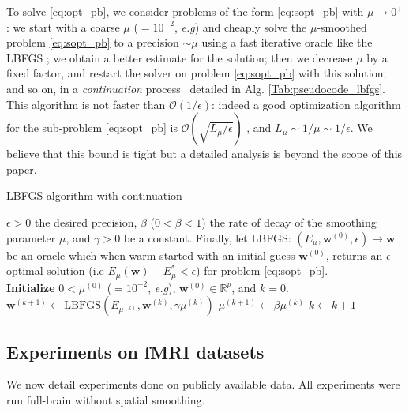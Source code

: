 To solve \eqref{eq:opt_pb}, we consider problems of the form
\eqref{eq:sopt_pb} with $\mu \rightarrow 0^+$: we start with a coarse
$\mu$ ($= 10^{-2}$, \emph{e.g}) and cheaply solve the $\mu$-smoothed problem
\eqref{eq:sopt_pb} to a precision $\sim \mu$ using a fast
iterative oracle like the LBFGS \citep{ciyou1994}; we
obtain a better estimate for the solution; then we decrease $\mu$ by a fixed factor,
and restart the solver on problem \eqref{eq:sopt_pb} with this solution; and so on, in a 
\emph{continuation} process~\citep{NESTA} detailed in Alg.
\ref{Tab:pseudocode_lbfgs}.
This algorithm is not faster than
$\mathcal{O}(1/\epsilon)$: indeed a good optimization algorithm
for the sub-problem \eqref{eq:sopt_pb} is $\mathcal{O}(\sqrt{L_{\mu}/\epsilon})$
\citep{nesterov1983}, and $L_{\mu} \sim 1 / \mu \sim 1 / \epsilon$. We
believe that this bound is tight but a detailed analysis is
beyond the scope of this paper.
\begin{algorithm}
  \caption{LBFGS algorithm with continuation}
  \label{Tab:pseudocode_lbfgs}  
  \begin{algorithmic}[1]  
    \Require $\epsilon > 0$ the desired precision, $\beta$ ($0 < \beta <
    1$) the rate of decay of the smoothing parameter $\mu$, and $\gamma > 0$ be a constant.
    Finally,
    let LBFGS: $(E_\mu, \mathbf{w}^{(0)}, \epsilon) \mapsto \mathbf{w}$ be
    an oracle which when warm-started with an initial guess
    $\mathbf{w}^{(0)}$, returns an $\epsilon$-optimal
    solution (i.e $E_\mu(\mathbf{w}) - E_\mu^{*} < \epsilon$) for problem \eqref{eq:sopt_pb}.\\
    \textbf{Initialize} $ 0 < \mu^{(0)}$ ($= 10^{-2}$, \emph{e.g}),
    $\mathbf{w}^{(0)}\in \mathbb{R}^p$, and $k = 0$.
    \State $\mathbf{w}^{(k + 1)} \leftarrow \mbox{LBFGS}(E_{\mu^{(k)}}, \mathbf{w}^{(k)}, \gamma\mu^{(k)})$
    \State $\mu^{(k + 1)} \leftarrow \beta \mu^{(k)}$
    \State $k \leftarrow k + 1$
    \EndWhile
  \end{algorithmic}
\end{algorithm}

\subsection{Experiments on fMRI datasets}
\label{sec:experiments}
We now detail experiments done on publicly available
data. All experiments were run full-brain without spatial smoothing.

